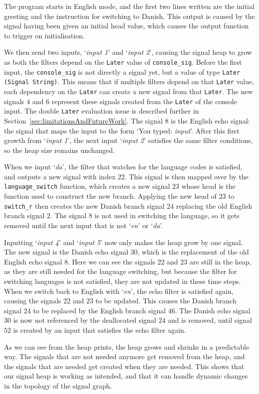 The program starts in English mode, and the first two lines written are the initial greeting and the instruction for switching to Danish. This output is caused by the signal having been given an initial head value, which causes the output function to trigger on initialisation.

We then send two inputs, `\textit{input 1}' and `\textit{input 2}', causing the signal heap to grow as both the filters depend on the \texttt{Later} value of \texttt{console\_sig}. Before the first input, the \texttt{console\_sig} is not directly a signal yet, but a value of type \texttt{Later (Signal String)}. This means that if multiple filters depend on that \texttt{Later} value, each dependency on the \texttt{Later} can create a new signal from that \texttt{Later}. The new signals $4$ and $6$ represent these signals created from the \texttt{Later} of the console input. The double \texttt{Later} evaluation issue is described further in Section~\ref{sec:limitationsAndFutureWork}.
The signal $8$ is the English echo signal: the signal that maps the input to the form `You typed: \textit{input}'. After this first growth from `\textit{input 1}', the next input `\textit{input 2}' satisfies the same filter conditions, so the heap size remains unchanged.

When we input `\textit{da}', the filter that watches for the language codes is satisfied, and outputs a new signal with index $22$. This signal is then mapped over by the \texttt{language\_switch} function, which creates a new signal $23$ whose head is the function used to construct the new branch. Applying the new head of $23$ to \texttt{switch\_r} then creates the new Danish branch signal $24$ replacing the old English branch signal $2$. The signal $8$ is not used in switching the language, so it gets removed until the next input that is not `\textit{en}' or `\textit{da}'.

Inputting `\textit{input 4}' and `\textit{input 5}' now only makes the heap grow by one signal. The new signal is the Danish echo signal $30$, which is the replacement of the old English echo signal $8$. Here we can see the signals $22$ and $23$ are still in the heap, as they are still needed for the language switching, but because the filter for switching languages is not satisfied, they are not updated in these time steps.
When we switch back to English with `\textit{en}', the echo filter is satisfied again, causing the signals $22$ and $23$ to be updated. This causes the Danish branch signal $24$ to be replaced by the English branch signal $46$. The Danish echo signal $30$ is now not referenced by the deallocated signal $24$ and is removed, until signal $52$ is created by an input that satisfies the echo filter again.

As we can see from the heap prints, the heap grows and shrinks in a predictable way. The signals that are not needed anymore get removed from the heap, and the signals that are needed get created when they are needed. This shows that our signal heap is working as intended, and that it can handle dynamic changes in the topology of the signal graph.
